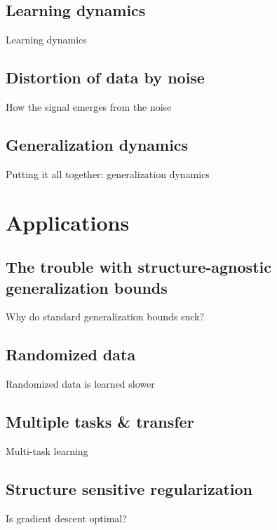 \documentclass{beamer}
\begin{document}
\subsection{Learning dynamics}
\begin{frame}{Learning dynamics}

\end{frame}

\subsection{Distortion of data by noise}
\begin{frame}{How the signal emerges from the noise}

\end{frame}

\subsection{Generalization dynamics}
\begin{frame}{Putting it all together: generalization dynamics}

\end{frame}


\section{Applications}

\subsection{The trouble with structure-agnostic generalization bounds}
\begin{frame}{Why do standard generalization bounds suck?}
\end{frame}

\subsection{Randomized data}
\begin{frame}{Randomized data is learned slower}
\end{frame}

\subsection{Multiple tasks \& transfer}
\begin{frame}{Multi-task learning}
\end{frame}

\subsection{Structure sensitive regularization}
\begin{frame}{Is gradient descent optimal?}
\end{frame}
\end{document}

